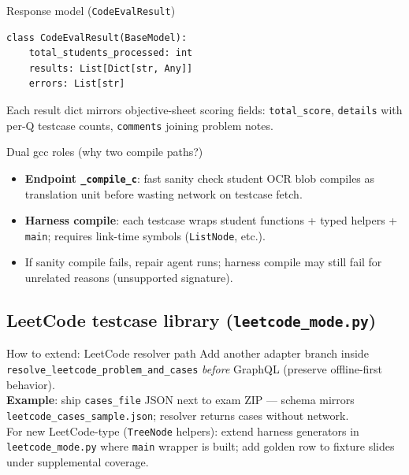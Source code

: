 \documentclass[aspectratio=169]{beamer}
\begin{document}
\begin{frame}[fragile]{Response model (\texttt{CodeEvalResult})}
\begin{lstlisting}[style=py]
class CodeEvalResult(BaseModel):
    total_students_processed: int
    results: List[Dict[str, Any]]
    errors: List[str]
\end{lstlisting}
\vfill
\tiny Each result dict mirrors objective-sheet scoring fields: \texttt{total\_score}, \texttt{details} with per-Q testcase counts, \texttt{comments} joining problem notes.
\end{frame}

\begin{frame}{Dual gcc roles (why two compile paths?)}
  \small
  \begin{itemize}
    \item \textbf{Endpoint \texttt{\_compile\_c}}: fast sanity check student OCR blob compiles as translation unit before wasting network on testcase fetch.
    \item \textbf{Harness compile}: each testcase wraps student functions + typed helpers + \texttt{main}; requires link-time symbols (\texttt{ListNode}, etc.).
    \item If sanity compile fails, repair agent runs; harness compile may still fail for unrelated reasons (unsupported signature).
  \end{itemize}
\end{frame}

\subsection{LeetCode testcase library (\texttt{leetcode\_mode.py})}

\begin{frame}{How to extend: LeetCode resolver path}
  \small
  Add another adapter branch inside \texttt{resolve\_leetcode\_problem\_and\_cases} \emph{before} GraphQL (preserve offline-first behavior).\\
  \textbf{Example}: ship \texttt{cases\_file} JSON next to exam ZIP --- schema mirrors \texttt{leetcode\_cases\_sample.json}; resolver returns cases without network.\\
  For new LeetCode-type (\texttt{TreeNode} helpers): extend harness generators in \texttt{leetcode\_mode.py} where \texttt{main} wrapper is built; add golden row to fixture slides under supplemental coverage.
\end{frame}
\end{document}
